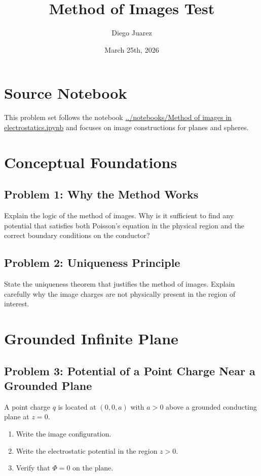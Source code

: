 \documentclass[hidelinks]{article}
\title{\textbf{Method of Images Test}}
\author{Diego Juarez}
\date{March 25th, 2026}
\begin{document}
\hypersetup{bookmarksnumbered=true}
\pagecolor{black}
\color{white}
\maketitle

\begin{Large}
\tableofcontents
\end{Large}
\pagebreak

\section{Source Notebook}
This problem set follows the notebook
\url{../notebooks/Method of images in electrostatics.ipynb}
and focuses on image constructions for planes and spheres.

\section{Conceptual Foundations}
\subsection{Problem 1: Why the Method Works}
Explain the logic of the method of images. Why is it sufficient to find any potential that satisfies both Poisson's equation in the physical region and the correct boundary conditions on the conductor?

\subsection{Problem 2: Uniqueness Principle}
State the uniqueness theorem that justifies the method of images. Explain carefully why the image charges are not physically present in the region of interest.

\section{Grounded Infinite Plane}
\subsection{Problem 3: Potential of a Point Charge Near a Grounded Plane}
A point charge $q$ is located at $(0,0,a)$ with $a>0$ above a grounded conducting plane at $z=0$.
\begin{enumerate}[label=\alph*)]
\item Write the image configuration.
\item Write the electrostatic potential in the region $z>0$.
\item Verify that $\Phi=0$ on the plane.
\end{enumerate}
\end{document}
